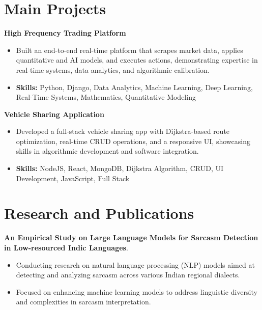 \documentclass[a4paper,11pt]{article}
\begin{document}
\section{\textbf{Main Projects}}

\vspace{1mm}
  \textbf{High Frequency Trading Platform  }
\vspace{-1.5mm} %
\begin{itemize}
  \item Built an end-to-end real-time platform that scrapes market data, applies quantitative and AI models, and executes actions, demonstrating expertise in real-time systems, data analytics, and algorithmic calibration.
\vspace{-3mm}
  \item \textbf{Skills:} Python, Django, Data Analytics, Machine Learning, Deep Learning, Real-Time Systems, Mathematics, Quantitative Modeling
\end{itemize}


\vspace{1mm}
   \textbf{Vehicle Sharing Application }
\vspace{-1.5mm} %
\begin{itemize}
  \item Developed a full-stack vehicle sharing app with Dijkstra-based route optimization, real-time CRUD operations, and a responsive UI, showcasing skills in algorithmic development and software integration.
\vspace{-3mm}
  \item \textbf{Skills:} NodeJS, React, MongoDB, Dijkstra Algorithm, CRUD, UI Development, JavaScript, Full Stack
\end{itemize}



\section{\textbf{Research and Publications} \hfill }
\vspace{1mm}
  \textbf{An Empirical Study on Large Language Models for Sarcasm Detection in Low-resourced Indic Languages}.
\vspace{-1mm} %
\begin{itemize}
  \item Conducting research on natural language processing (NLP) models aimed at detecting and analyzing sarcasm across various Indian regional dialects.
\vspace{-3mm}
  \item Focused on enhancing machine learning models to address linguistic diversity and complexities in sarcasm interpretation.
\end{itemize}
\end{document}
